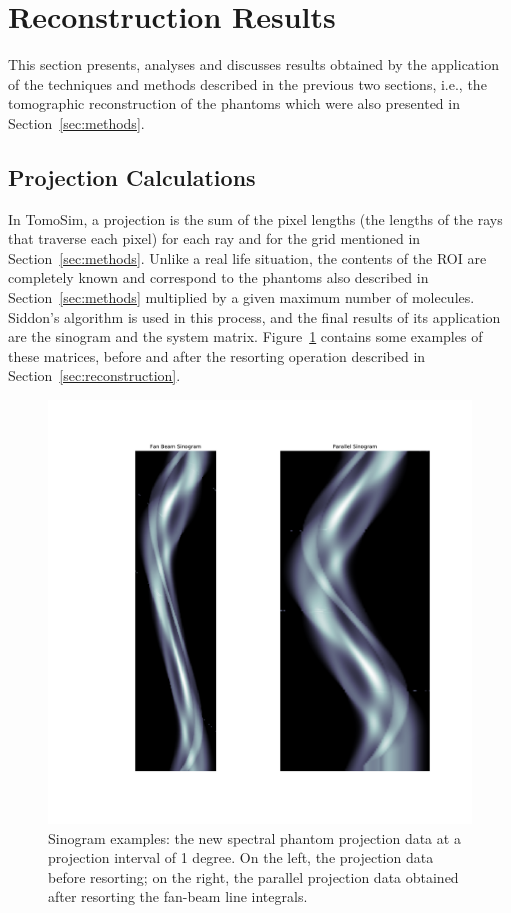 \section{Reconstruction Results}%
\label{sec:reconstruction_results}


This section presents, analyses and discusses results obtained by the
application of the techniques and methods described in the previous two
sections, i.e., the tomographic reconstruction of the phantoms which
were also presented in Section~\ref{sec:methods}.

\subsection{Projection Calculations}%
\label{sub:projection_calculations}

In TomoSim, a projection is the sum of the pixel lengths (the lengths of
the rays that traverse each pixel) for each ray and for the grid
mentioned in Section~\ref{sec:methods}. Unlike a real life situation,
the contents of the ROI are completely known and correspond to the
phantoms also described in Section~\ref{sec:methods} multiplied by a
given maximum number of molecules. Siddon's algorithm is used in this
process, and the final results of its application are the sinogram and
the system matrix. Figure~\ref{fig:sinograms} contains some examples of
these matrices, before and after the resorting operation described in
Section~\ref{sec:reconstruction}.

\begin{figure}[htpb]
    \centering
    \includegraphics[clip, trim=7cm 4cm 3.2cm 3.5cm,
    width=.6\textwidth]{img/pdf/fanbeam_comparison.pdf}
    \caption{Sinogram examples: the new spectral phantom projection data
    at a projection interval of 1 degree. On the left, the projection
    data before resorting; on the right, the parallel projection data
    obtained after resorting the fan-beam line integrals.}
    \label{fig:sinograms}
\end{figure}

